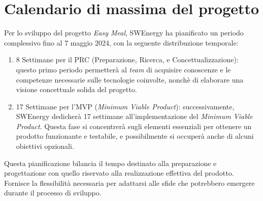 \section{Calendario di massima del progetto}

Per lo sviluppo del progetto \textit{Easy Meal}, SWEnergy ha 
pianificato un periodo complessivo fino al 7 maggio 2024, con la seguente
distribuzione temporale:
\begin{enumerate}
	\item 8 Settimane per il PRC (Preparazione, Ricerca, e Concettualizzazione): 
	questo primo periodo permetterà al \textit{team} di acquisire conoscenze e 
	le competenze necessarie sulle tecnologie coinvolte, nonchè di elaborare una 
    visione concettuale solida del progetto.

	\item 17 Settimane per l'MVP (\textit{Minimum Viable Product}): 
	successivamente, SWEnergy dedicherà 17 settimane all'implementazione del
	\textit{Minimum Viable Product}. Questa fase si concentrerà sugli elementi 
	essenziali per ottenere un prodotto funzionante e testabile, 
	e possibilmente si occuperà anche di alcuni obiettivi opzionali.
\end{enumerate}

\noindent
Questa pianificazione bilancia il tempo destinato alla preparazione e progettazione 
con quello riservato alla realizzazione effettiva del prodotto. 
Fornisce la flessibilità necessaria per adattarsi alle sfide che potrebbero 
emergere durante il processo di sviluppo.

